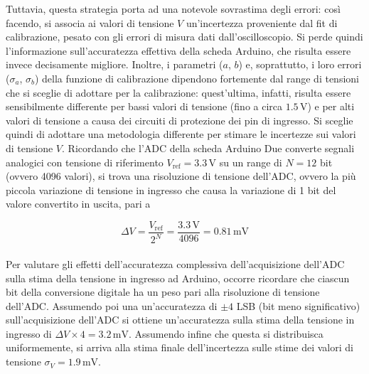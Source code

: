 \documentclass[a4paper,11pt]{article} %
\begin{document}
Tuttavia, questa strategia porta ad una notevole sovrastima degli errori: così facendo, si associa ai valori di tensione
$V$ un'incertezza proveniente dal fit di calibrazione, pesato con gli errori di misura dati dall'oscilloscopio. Si perde
quindi l'informazione sull'accuratezza effettiva della scheda Arduino, che risulta essere invece decisamente migliore.
Inoltre, i parametri ($a$, $b$) e, soprattutto, i loro errori ($\sigma_a$, $\sigma_b$) della funzione di calibrazione
dipendono fortemente dal range di tensioni che si sceglie di adottare per la calibrazione: quest'ultima, infatti,
risulta essere sensibilmente differente per bassi valori di tensione (fino a circa $1.5\,\si{\volt}$) e per alti valori
di tensione a causa dei circuiti di protezione dei pin di ingresso. Si sceglie quindi di adottare una metodologia
differente per stimare le incertezze sui valori di tensione $V$. Ricordando che l'ADC della scheda Arduino Due converte
segnali analogici con tensione di riferimento $V_{\text{ref}}=3.3\,\si{\volt}$ su un range di $N = 12$ bit (ovvero 4096
valori), si trova una risoluzione di tensione dell’ADC, ovvero la più piccola variazione di tensione in ingresso che
causa la variazione di 1 bit del valore convertito in uscita, pari a 

\begin{equation}
	\Delta V = \frac{V_{\text{ref}}}{2^N} = \frac{3.3\,\si{\volt}}{4096} = 0.81 \,\si{\milli\volt}
\end{equation}\\
Per valutare gli effetti dell'accuratezza complessiva dell’acquisizione dell’ADC sulla stima della tensione in ingresso
ad Arduino, occorre ricordare che ciascun bit della conversione digitale ha un peso pari alla risoluzione di tensione
dell’ADC. Assumendo poi una un'accuratezza di $\pm 4$ LSB (bit meno significativo) sull’acquisizione dell’ADC si ottiene un'accuratezza sulla
stima della tensione in ingresso di $\Delta V \times 4 = 3.2 \,\si{\milli\volt}$. Assumendo infine che questa si
distribuisca uniformemente, si arriva alla stima finale dell'incertezza sulle stime dei valori di tensione $\sigma_{V} =
1.9 \,\si{\milli\volt}$. 


\end{document}
